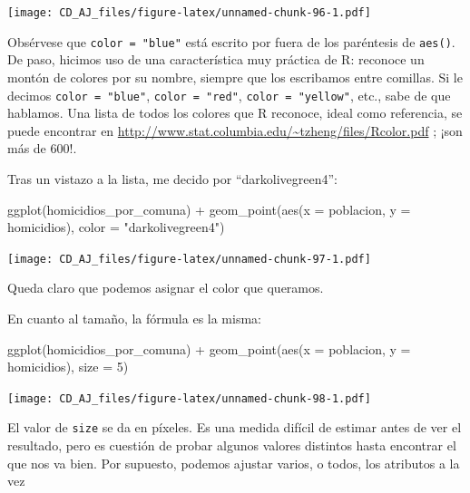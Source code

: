 \documentclass[
]{book}
\newenvironment{Shaded}{\begin{snugshade}}{\end{snugshade}}
\newcommand{\AttributeTok}[1]{\textcolor[rgb]{0.77,0.63,0.00}{#1}}
\newcommand{\DecValTok}[1]{\textcolor[rgb]{0.00,0.00,0.81}{#1}}
\newcommand{\FunctionTok}[1]{\textcolor[rgb]{0.00,0.00,0.00}{#1}}
\newcommand{\NormalTok}[1]{#1}
\newcommand{\SpecialCharTok}[1]{\textcolor[rgb]{0.00,0.00,0.00}{#1}}
\newcommand{\StringTok}[1]{\textcolor[rgb]{0.31,0.60,0.02}{#1}}
\begin{document}
\texttt{[image: CD\_AJ\_files/figure-latex/unnamed-chunk-96-1.pdf]}

Obsérvese que \texttt{color\ =\ "blue"} está escrito por fuera de los paréntesis de \texttt{aes()}. De paso, hicimos uso de una característica muy práctica de R: reconoce un montón de colores por su nombre, siempre que los escribamos entre comillas. Si le decimos \texttt{color\ =\ "blue"}, \texttt{color\ =\ "red"}, \texttt{color\ =\ "yellow"}, etc., sabe de que hablamos. Una lista de todos los colores que R reconoce, ideal como referencia, se puede encontrar en \url{http://www.stat.columbia.edu/~tzheng/files/Rcolor.pdf} ; ¡son más de 600!.

Tras un vistazo a la lista, me decido por ``darkolivegreen4'':

\begin{Shaded}
\begin{Highlighting}[]
\FunctionTok{ggplot}\NormalTok{(homicidios\_por\_comuna) }\SpecialCharTok{+} 
    \FunctionTok{geom\_point}\NormalTok{(}\FunctionTok{aes}\NormalTok{(}\AttributeTok{x =}\NormalTok{ poblacion, }\AttributeTok{y =}\NormalTok{ homicidios), }\AttributeTok{color =} \StringTok{"darkolivegreen4"}\NormalTok{)}
\end{Highlighting}
\end{Shaded}

\texttt{[image: CD\_AJ\_files/figure-latex/unnamed-chunk-97-1.pdf]}

Queda claro que podemos asignar el color que queramos.

En cuanto al tamaño, la fórmula es la misma:

\begin{Shaded}
\begin{Highlighting}[]
\FunctionTok{ggplot}\NormalTok{(homicidios\_por\_comuna) }\SpecialCharTok{+} 
    \FunctionTok{geom\_point}\NormalTok{(}\FunctionTok{aes}\NormalTok{(}\AttributeTok{x =}\NormalTok{ poblacion, }\AttributeTok{y =}\NormalTok{ homicidios), }\AttributeTok{size =} \DecValTok{5}\NormalTok{)}
\end{Highlighting}
\end{Shaded}

\texttt{[image: CD\_AJ\_files/figure-latex/unnamed-chunk-98-1.pdf]}

El valor de \texttt{size} se da en píxeles. Es una medida difícil de estimar antes de ver el resultado, pero es cuestión de probar algunos valores distintos hasta encontrar el que nos va bien. Por supuesto, podemos ajustar varios, o todos, los atributos a la vez
\end{document}
